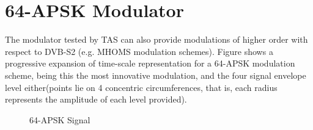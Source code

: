 \clearpage

\section{64-APSK Modulator}

The modulator tested by TAS can also provide modulations of higher order with respect to DVB-S2 (e.g. MHOMS modulation schemes). Figure shows a progressive expansion of time-scale representation for a 64-APSK modulation scheme, being this the most innovative modulation, and the four signal envelope level either(points lie on 4 concentric circumferences, that is, each radius represents the amplitude of each level provided).


\begin{figure} \centering
{} \qquad
{} \qquad
{} \qquad
{}
\caption{64-APSK Signal} \label{fig:64APSKwvform}
\end{figure}
